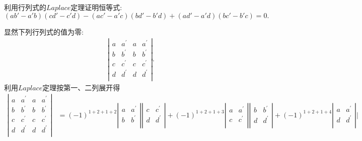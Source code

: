 \documentclass[lang=cn,newtx,10pt,scheme=chinese]{elegantbook}
\begin{document}
\begin{exercise}
利用行列式的$Laplace$定理证明恒等式:
\[
(ab' - a'b)(cd' - c'd)-(ac' - a'c)(bd' - b'd)+(ad' - a'd)(bc' - b'c)=0.
\]
\end{exercise}
\begin{solution}
显然下列行列式的值为零:
\begin{align*}
\left| \begin{matrix}
a&		a^{\prime}&		a&		a^{\prime}\\
b&		b^{\prime}&		b&		b^{\prime}\\
c&		c^{\prime}&		c&		c^{\prime}\\
d&		d^{\prime}&		d&		d^{\prime}\\
\end{matrix} \right|.
\end{align*}
利用$Laplace$定理按第一、二列展开得
\begin{align*}
\left| \begin{matrix}
a&		a^{\prime}&		a&		a^{\prime}\\
b&		b^{\prime}&		b&		b^{\prime}\\
c&		c^{\prime}&		c&		c^{\prime}\\
d&		d^{\prime}&		d&		d^{\prime}\\
\end{matrix} \right|&=\left( -1 \right) ^{1+2+1+2}\left| \begin{matrix}
a&		a^{\prime}\\
b&		b^{\prime}\\
\end{matrix} \right|\left| \begin{matrix}
c&		c^{\prime}\\
d&		d^{\prime}\\
\end{matrix} \right|+\left( -1 \right) ^{1+2+1+3}\left| \begin{matrix}
a&		a^{\prime}\\
c&		c^{\prime}\\
\end{matrix} \right|\left| \begin{matrix}
b&		b^{\prime}\\
d&		d^{\prime}\\
\end{matrix} \right|+\left( -1 \right) ^{1+2+1+4}\left| \begin{matrix}
a&		a^{\prime}\\
d&		d^{\prime}\\
\end{matrix} \right|\left| \begin{matrix}

\end{matrix}
\end{align*}
\end{solution}
\end{document}
